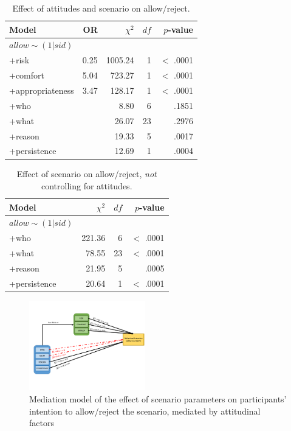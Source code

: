 \begin{table}
	\centering
	\caption{Effect of attitudes and scenario on allow/reject.}
	\label{tab:mediationANOVA}
	\begin{tabular}{ l | r | r | r | r }
		\hline
		Model & OR	&	\textbf{$\chi^2$} & $df$ & $p$-value 	\\ \hline
		$allow\sim(1 | sid)$ &	&		  &	    &				\\
		+risk &				0.25 &	1005.24  &    1 &		$<$ .0001 \\
		+comfort &			5.04 &	723.27  &     1 &		$<$ .0001 \\
		+appropriateness &	3.47 &	128.17  &	  1 & 		$<$ .0001 \\ \hline
		+who &					&	8.80	& 	  6 & 		.1851 	\\
		+what &					&	26.07 &	  	 23 &		.2976 	\\
		+reason &				&	19.33 & 	  5 & 		.0017	\\
		+persistence &			&	12.69 &	 	  1 & 		.0004 	\\
		\hline
	\end{tabular}
\end{table}

\begin{table}
	\centering
	\caption{Effect of scenario on allow/reject, \emph{not} controlling for attitudes.}
	\label{tab:marginalANOVA}
	\begin{tabular}{ l | r | r | r }
		\hline
		Model &	$\chi^2$ & $df$ & $p$-value 	\\ \hline
		$allow\sim(1 | sid)$ &		  	&	    &				\\
		+who &					221.36	& 	  6 & 		$<$ .0001 	\\
		+what &					78.55 &		  23 &		$<$ .0001 	\\
		+reason &				21.95 & 	  5 & 		  .0005		\\
		+persistence &			20.64 &		  1 & 		$<$ .0001 	\\
		\hline
	\end{tabular}
\end{table}

\begin{figure}
	\centering
	\includegraphics[width=0.45\textwidth]{figures/allow.pdf}
	\caption{Mediation model of the effect of scenario parameters on participants' intention to allow/reject the scenario, mediated by attitudinal factors}
	\label{fig:mediationAllow}
\end{figure}

